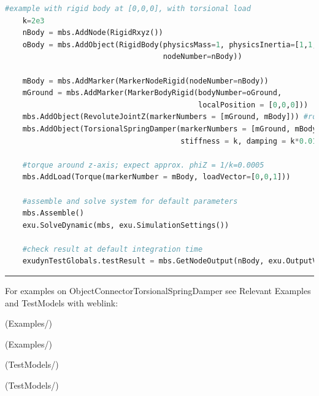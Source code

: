 \begin{lstlisting}[language=Python, firstnumber=1]
    #example with rigid body at [0,0,0], with torsional load
    k=2e3
    nBody = mbs.AddNode(RigidRxyz())
    oBody = mbs.AddObject(RigidBody(physicsMass=1, physicsInertia=[1,1,1,0,0,0], 
                                    nodeNumber=nBody))
    
    mBody = mbs.AddMarker(MarkerNodeRigid(nodeNumber=nBody))
    mGround = mbs.AddMarker(MarkerBodyRigid(bodyNumber=oGround, 
                                            localPosition = [0,0,0]))
    mbs.AddObject(RevoluteJointZ(markerNumbers = [mGround, mBody])) #rotation around ground Z-axis
    mbs.AddObject(TorsionalSpringDamper(markerNumbers = [mGround, mBody], 
                                        stiffness = k, damping = k*0.01, offset = 0))

    #torque around z-axis; expect approx. phiZ = 1/k=0.0005
    mbs.AddLoad(Torque(markerNumber = mBody, loadVector=[0,0,1])) 

    #assemble and solve system for default parameters
    mbs.Assemble()
    exu.SolveDynamic(mbs, exu.SimulationSettings())
    
    #check result at default integration time
    exudynTestGlobals.testResult = mbs.GetNodeOutput(nBody, exu.OutputVariableType.Rotation)[2]
\end{lstlisting}

\vspace{6pt}\par\noindent\rule{\textwidth}{0.4pt}
%
\noindent For examples on ObjectConnectorTorsionalSpringDamper see Relevant Examples and TestModels with weblink:
\bi
\item {} (Examples/)
\item {} (Examples/)
\item {} (TestModels/)
\item {} (TestModels/)

\ei

%
\newpage

